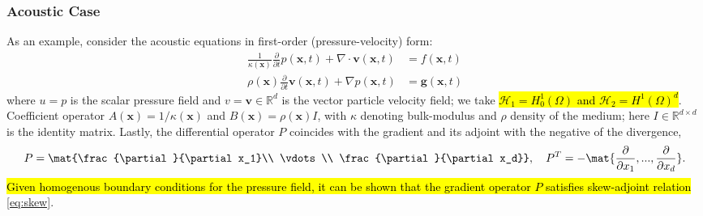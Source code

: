 



%

\subsubsection{Acoustic Case}

As an example, consider the acoustic equations in first-order (pressure-velocity) form:
\begin{equation}\label{eq:acoustics}
\begin{split}
	\frac{1}{\kappa(\mathbf x)} \frac{\partial}{\partial t} p(\mathbf x,t) + \nabla\cdot \mathbf v(\mathbf x,t) 
		&= f(\mathbf x,t)\\
	\rho(\mathbf x) \frac{\partial}{\partial t} \mathbf v(\mathbf x,t) + \nabla p(\mathbf x,t) 
		&= \mathbf g(\mathbf x,t)
\end{split}
\end{equation}
where $u=p$ is the scalar pressure field and $v=\mathbf v\in\mathbb R^d$ is the vector particle velocity field; we take \hl{$\mathcal H_1=H^1_0(\Omega)$ and $\mathcal H_2=H^1(\Omega)^d$}. %
Coefficient operator $A(\mathbf x)=1/\kappa(\mathbf x)$ and $B(\mathbf x)=\rho(\mathbf x) I$, with $\kappa$ denoting bulk-modulus and $\rho$ density of the medium; here $I\in\mathbb R^{d\times d}$ is the identity matrix.
Lastly, the differential operator $P$ coincides with the gradient and its adjoint with the negative of the divergence,
\[
	P = \mat{\frac{\partial}{\partial x_1}\\ \vdots \\ \frac{\partial}{\partial x_d}}, \quad 
	P^T = - \mat{\frac{\partial}{\partial x_1},...,\frac{\partial}{\partial x_d}}.
\]
\hl{
Given homogenous boundary conditions for the pressure field, it can be shown that the gradient operator $P$ satisfies skew-adjoint relation} \ref{eq:skew}.

